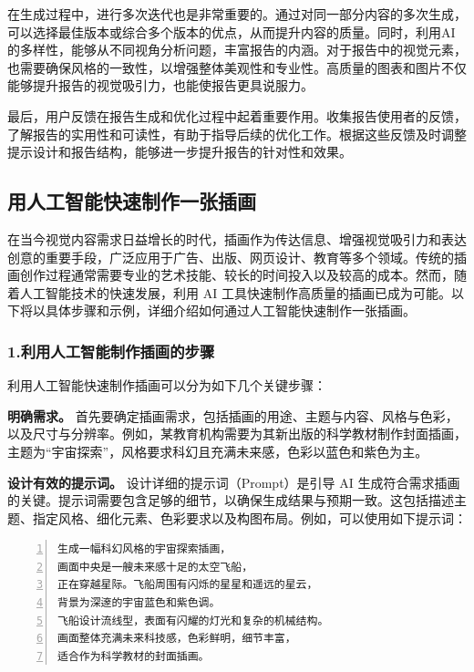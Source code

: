 在生成过程中，进行多次迭代也是非常重要的。通过对同一部分内容的多次生成，可以选择最佳版本或综合多个版本的优点，从而提升内容的质量。同时，利用AI的多样性，能够从不同视角分析问题，丰富报告的内涵。对于报告中的视觉元素，也需要确保风格的一致性，以增强整体美观性和专业性。高质量的图表和图片不仅能够提升报告的视觉吸引力，也能使报告更具说服力。

最后，用户反馈在报告生成和优化过程中起着重要作用。收集报告使用者的反馈，了解报告的实用性和可读性，有助于指导后续的优化工作。根据这些反馈及时调整提示设计和报告结构，能够进一步提升报告的针对性和效果。

\subsection{用人工智能快速制作一张插画}

在当今视觉内容需求日益增长的时代，插画作为传达信息、增强视觉吸引力和表达创意的重要手段，广泛应用于广告、出版、网页设计、教育等多个领域。传统的插画创作过程通常需要专业的艺术技能、较长的时间投入以及较高的成本。然而，随着人工智能技术的快速发展，利用 AI 工具快速制作高质量的插画已成为可能。以下将以具体步骤和示例，详细介绍如何通过人工智能快速制作一张插画。

\subsubsection{1.利用人工智能制作插画的步骤}

利用人工智能快速制作插画可以分为如下几个关键步骤：

\textbf{明确需求。} 首先要确定插画需求，包括插画的用途、主题与内容、风格与色彩，以及尺寸与分辨率。例如，某教育机构需要为其新出版的科学教材制作封面插画，主题为“宇宙探索”，风格要求科幻且充满未来感，色彩以蓝色和紫色为主。

\textbf{设计有效的提示词。} 设计详细的提示词（Prompt）是引导 AI 生成符合需求插画的关键。提示词需要包含足够的细节，以确保生成结果与预期一致。这包括描述主题、指定风格、细化元素、色彩要求以及构图布局。例如，可以使用如下提示词：

\begin{lstlisting}[language={python}, label={}, caption={}, basicstyle=\footnotesize\ttfamily, breaklines=true, numbers=left, frame=single]
生成一幅科幻风格的宇宙探索插画，
画面中央是一艘未来感十足的太空飞船，
正在穿越星际。飞船周围有闪烁的星星和遥远的星云，
背景为深邃的宇宙蓝色和紫色调。
飞船设计流线型，表面有闪耀的灯光和复杂的机械结构。
画面整体充满未来科技感，色彩鲜明，细节丰富，
适合作为科学教材的封面插画。
\end{lstlisting}

